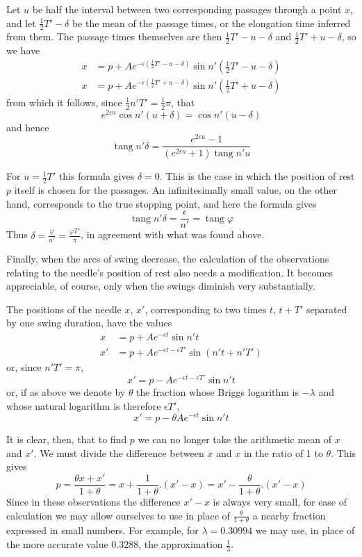 Let $u$ be half the interval between two corresponding passages through a point $x$, and let $\tfrac12T'-\delta$ be the mean of the passage times, or the elongation time inferred from them. The passage times themselves are then $\tfrac12T'-u-\delta$ and $\tfrac12T'+u-\delta$, so we have
\[
\begin{aligned}
x&=p+Ae^{-\epsilon(\tfrac12T'-u-\delta)}\sin n'(\tfrac12T'-u-\delta)\\
x&=p+Ae^{-\epsilon(\tfrac12T'+u-\delta)}\sin n'(\tfrac12T'+u-\delta)
\end{aligned}
\]
from which it follows, since $\tfrac12n'T'=\tfrac12\pi$, that
\[
e^{2\epsilon u}\cos n'(u+\delta)=\cos n'(u-\delta)
\]
and hence
\[
\operatorname{tang}n'\delta=\frac{e^{2\epsilon u}-1}{(e^{2\epsilon u}+1)\operatorname{tang}n'u}
\]

For $u=\tfrac12T'$ this formula gives $\delta=0$. This is the case in which the position of rest $p$ itself is chosen for the passages. An infinitesimally small value, on the other hand, corresponds to the true stopping point, and here the formula gives
\[
\operatorname{tang}n'\delta=\frac{\epsilon}{n'}=\operatorname{tang}\varphi
\]
Thus $\delta=\frac{\varphi}{n'}=\frac{\varphi T'}{\pi}$, in agreement with what was found above.

Finally, when the arcs of swing decrease, the calculation of the observations relating to the needle’s position of rest also needs a modification. It becomes appreciable, of course, only when the swings diminish very substantially.

The positions of the needle $x$, $x'$, corresponding to two times $t$, $t+T'$ separated by one swing duration, have the values
\[
\begin{aligned}
x&=p+Ae^{-\epsilon t}\sin n't\\
x'&=p+Ae^{-\epsilon t-\epsilon T'}\sin(n't+n'T')
\end{aligned}
\]
or, since $n'T'=\pi$,
\[
x'=p-Ae^{-\epsilon t-\epsilon T'}\sin n't
\]
or, if as above we denote by $\theta$ the fraction whose Briggs logarithm is $-\lambda$ and whose natural logarithm is therefore $\epsilon T'$,
\[
x'=p-\theta Ae^{-\epsilon t}\sin n't
\]

It is clear, then, that to find $p$ we can no longer take the arithmetic mean of $x$ and $x'$. We must divide the difference between $x$ and $x$ in the ratio of 1 to $\theta$. This gives
\[
p=\frac{\theta x+x'}{1+\theta}=x+\frac{1}{1+\theta}.(x'-x)=x'-\frac{\theta}{1+\theta}.(x'-x)
\]
Since in these observations the difference $x'-x$ is always very small, for ease of calculation we may allow ourselves to use in place of $\frac{\theta}{1+\theta}$ a nearby fraction expressed in small numbers.
For example, for $\lambda=0.30994$ we may use, in place of the more accurate value $0.3288$, the approximation $\tfrac13$.

